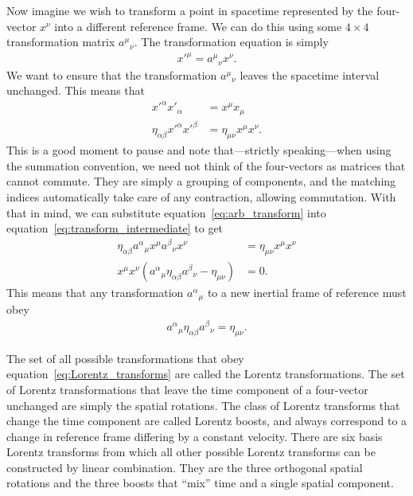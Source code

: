 \documentclass[titlepage,letterpaper,onecolumn,11pt,final]{report}
\numberwithin{equation}{section}
\numberwithin{figure}{section}
\begin{document}
Now imagine we wish to transform a point in spacetime represented by the four-vector $x^{\nu}$ into a different reference frame. We can do this using some $4 \times 4$ transformation matrix ${a^{\mu}}_{\nu}$. The transformation equation is simply
\begin{align}
	\label{eq:arb_transform}
	{x'}^{\mu} = {a^{\mu}}_{\nu} x^{\nu} .
\end{align}
%
We want to ensure that the transformation ${a^{\mu}}_{\nu}$ leaves the spacetime interval unchanged. This means that
\begin{equation}
\begin{split}
	\label{eq:transform_intermediate}
	{x'}^{\alpha} {x'}_{\alpha} &= x^{\mu} x_{\mu} \\
	\eta_{\alpha \beta} {x'}^{\alpha} {x'}^{\beta} &= \eta_{\mu \nu} x^{\mu} x^{\nu} .
\end{split}
\end{equation}
%
This is a good moment to pause and note that---strictly speaking---when using the summation convention, we need not think of the four-vectors as matrices that cannot commute. They are simply a grouping of components, and the matching indices automatically take care of any contraction, allowing commutation. With that in mind, we can substitute equation~\ref{eq:arb_transform} into equation~\ref{eq:transform_intermediate} to get
\begin{equation}
\begin{split}
	\eta_{\alpha \beta} {a^{\alpha}}_{\mu} x^{\mu} {a^{\beta}}_{\nu} x^{\nu} &= \eta_{\mu \nu} x^{\mu} x^{\nu} \\
	x^{\mu} x^{\nu} \left( {a^{\alpha}}_{\mu} \eta_{\alpha \beta} {a^{\beta}}_{\nu} - \eta_{\mu \nu} \right) &= 0 .
\end{split}
\end{equation}
This means that any transformation ${a^{\alpha}}_{\mu}$ to a new inertial frame of reference must obey
\begin{gather}
	\label{eq:Lorentz_transforms}
	{a^{\alpha}}_{\mu} \eta_{\alpha \beta} {a^{\beta}}_{\nu} = \eta_{\mu \nu} .
\end{gather}

The set of all possible transformations that obey equation~\ref{eq:Lorentz_transforms} are called the Lorentz transformations. The set of Lorentz transformations that leave the time component of a four-vector unchanged are simply the spatial rotations. The class of Lorentz transforms that change the time component are called Lorentz boosts, and always correspond to a change in reference frame differing by a constant velocity. There are six basis Lorentz transforms from which all other possible Lorentz transforms can be constructed by linear combination. They are the three orthogonal spatial rotations and the three boosts that ``mix'' time and a single spatial component.
\end{document}

